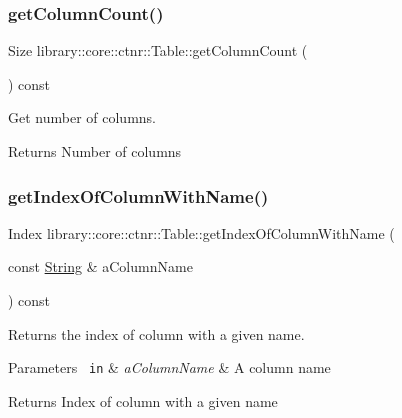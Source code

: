 \subsubsection{\texorpdfstring{getColumnCount()}{getColumnCount()}}
{\footnotesize\ttfamily Size library\+::core\+::ctnr\+::\+Table\+::get\+Column\+Count (\begin{DoxyParamCaption}{ }\end{DoxyParamCaption}) const}



Get number of columns. 


\begin{DoxyCode}{0}
\end{DoxyCode}


\begin{DoxyReturn}{Returns}
Number of columns 
\end{DoxyReturn}
\mbox{\label{classlibrary_1_1core_1_1ctnr_1_1_table_a6144fd9e6f0e18bb17f457a32ab3c027}} 
\subsubsection{\texorpdfstring{getIndexOfColumnWithName()}{getIndexOfColumnWithName()}}
{\footnotesize\ttfamily Index library\+::core\+::ctnr\+::\+Table\+::get\+Index\+Of\+Column\+With\+Name (\begin{DoxyParamCaption}\item[{const \mbox{\hyperlink{classlibrary_1_1core_1_1types_1_1_string}{String}} \&}]{a\+Column\+Name }\end{DoxyParamCaption}) const}



Returns the index of column with a given name. 


\begin{DoxyParams}[1]{Parameters}
\mbox{\texttt{ in}}  & {\em a\+Column\+Name} & A column name \\
\hline
\end{DoxyParams}
\begin{DoxyReturn}{Returns}
Index of column with a given name 
\end{DoxyReturn}
\mbox{\label{classlibrary_1_1core_1_1ctnr_1_1_table_a18036491993fea84dd2a595e7703258f}} 
